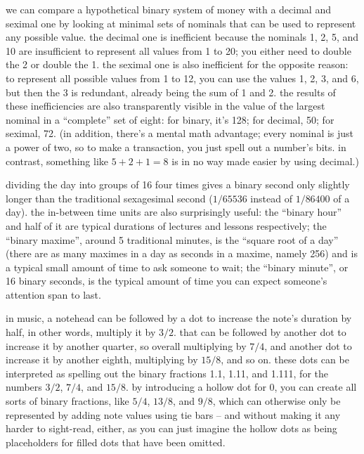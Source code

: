 \documentclass[../footnotes.tex]{subfiles}
\begin{document}
\myfootnote{} we can compare a hypothetical binary system of money with a decimal and seximal one by looking at minimal sets of nominals that can be used to represent any possible value. the decimal one is inefficient because the nominals 1, 2, 5, and 10 are insufficient to represent all values from 1 to 20; you either need to double the 2 or double the 1. the seximal one is also inefficient for the opposite reason: to represent all possible values from 1 to 12, you can use the values 1, 2, 3, and 6, but then the 3 is redundant, already being the sum of 1 and 2. the results of these inefficiencies are also transparently visible in the value of the largest nominal in a ``complete'' set of eight: for binary, it's 128; for decimal, 50; for seximal, 72. (in addition, there's a mental math advantage; every nominal is just a power of two, so to make a transaction, you just spell out a number's bits. in contrast, something like $5 + 2 + 1 = 8$ is in no way made easier by using decimal.)

\myfootnote{} dividing the day into groups of 16 four times gives a binary second only slightly longer than the traditional sexagesimal second ($1/65536$ instead of $1/86400$ of a day). the in-between time units are also surprisingly useful: the ``binary hour'' and half of it are typical durations of lectures and lessons respectively; the ``binary maxime'', around 5 traditional minutes, is the ``square root of a day'' (there are as many maximes in a day as seconds in a maxime, namely 256) and is a typical small amount of time to ask someone to wait; the ``binary minute'', or 16 binary seconds, is the typical amount of time you can expect someone's attention span to last.

\myfootnote{} in music, a notehead can be followed by a dot to increase the note's duration by half, in other words, multiply it by $3/2$. that can be followed by another dot to increase it by another quarter, so overall multiplying by $7/4$, and another dot to increase it by another eighth, multiplying by $15/8$, and so on. these dots can be interpreted as spelling out the binary fractions 1.1, 1.11, and 1.111, for the numbers $3/2$, $7/4$, and $15/8$. by introducing a hollow dot for 0, you can create all sorts of binary fractions, like $5/4$, $13/8$, and $9/8$, which can otherwise only be represented by adding note values using tie bars -- and without making it any harder to sight-read, either, as you can just imagine the hollow dots as being placeholders for filled dots that have been omitted.
\end{document}
